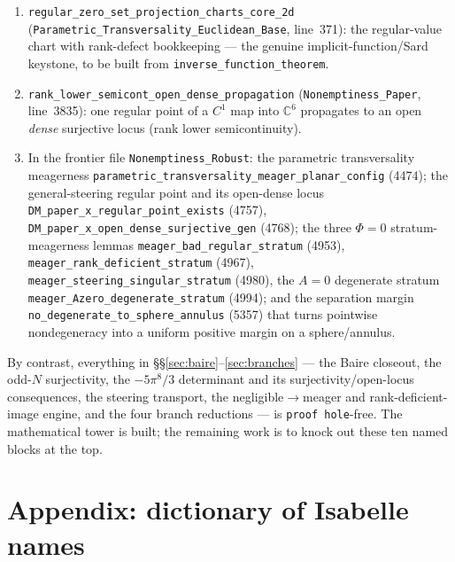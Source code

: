 \documentclass[11pt]{article}
\theoremstyle{plain}
\theoremstyle{definition}
\theoremstyle{remark}
\newcommand{\CC}{\mathbb{C}}
\newcommand{\Af}{A}                   %
\newcommand{\code}[1]{\texttt{\small #1}}
\begin{document}
\begin{enumerate}[leftmargin=1.8em]
\item \code{regular\_zero\_set\_projection\_charts\_core\_2d}
  (\code{Parametric\_Transversality\_Euclidean\_Base}, line~371): the
  regular-value chart with rank-defect bookkeeping --- the genuine
  implicit-function/Sard keystone, to be built from
  \code{inverse\_function\_theorem}.
\item \code{rank\_lower\_semicont\_open\_dense\_propagation}
  (\code{Nonemptiness\_Paper}, line~3835): one regular point of a $C^1$ map into
  $\CC^6$ propagates to an open \emph{dense} surjective locus (rank lower
  semicontinuity).
\item[3--10.] In the frontier file \code{Nonemptiness\_Robust}: the parametric
  transversality meagerness \code{parametric\_transversality\_meager\_planar\_config}
  (4474); the general-steering regular point and its open-dense locus
  \code{DM\_paper\_x\_regular\_point\_exists} (4757),
  \code{DM\_paper\_x\_open\_dense\_surjective\_gen} (4768); the three
  $\Phi=0$ stratum-meagerness lemmas \code{meager\_bad\_regular\_stratum} (4953),
  \code{meager\_rank\_deficient\_stratum} (4967),
  \code{meager\_steering\_singular\_stratum} (4980), the $\Af=0$ degenerate
  stratum \code{meager\_Azero\_degenerate\_stratum} (4994); and the separation
  margin \code{no\_degenerate\_to\_sphere\_annulus} (5357) that turns
  pointwise nondegeneracy into a uniform positive margin on a sphere/annulus.
\end{enumerate}

By contrast, everything in \S\S\ref{sec:baire}--\ref{sec:branches} --- the Baire
closeout, the odd-$N$ surjectivity, the $-5\pi^8/3$ determinant and its
surjectivity/open-locus consequences, the steering transport, the
negligible$\to$meager and rank-deficient-image engine, and the four branch
reductions --- is \code{proof hole}-free.  The mathematical tower is built; the
remaining work is to knock out these ten named blocks at the top.

\section*{Appendix: dictionary of Isabelle names}
\end{document}
